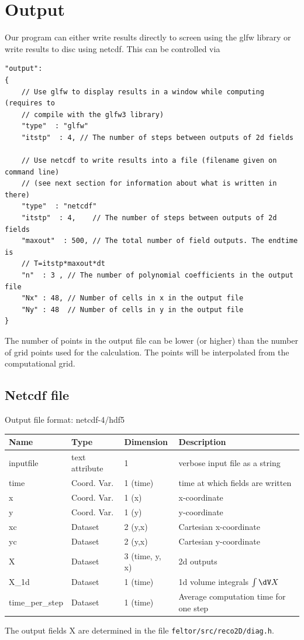 \section{Output}
Our program can either write results directly to screen using the glfw library
or write results to disc using netcdf.
This can be controlled via
\begin{verbatim}
"output":
{
    // Use glfw to display results in a window while computing (requires to
    // compile with the glfw3 library)
    "type"  : "glfw"
    "itstp"  : 4, // The number of steps between outputs of 2d fields

    // Use netcdf to write results into a file (filename given on command line)
    // (see next section for information about what is written in there)
    "type"  : "netcdf"
    "itstp"  : 4,    // The number of steps between outputs of 2d fields
    "maxout"  : 500, // The total number of field outputs. The endtime is
    // T=itstp*maxout*dt
    "n"  : 3 , // The number of polynomial coefficients in the output file
    "Nx" : 48, // Number of cells in x in the output file
    "Ny" : 48  // Number of cells in y in the output file
}
\end{verbatim}
The number of points in the output file can be lower (or higher) than the number of
grid points used for the calculation. The points will be interpolated from the
computational grid.
\subsection{Netcdf file}
Output file format: netcdf-4/hdf5

\begin{longtable}{lll>{\RaggedRight}p{7cm}}
\toprule
\rowcolor{gray!50}\textbf{Name} &  \textbf{Type} & \textbf{Dimension} & \textbf{Description}  \\ \midrule
inputfile        & text attribute & 1 & verbose input file as a string \\
time             & Coord. Var. & 1 (time) & time at which fields are written \\
x                & Coord. Var. & 1 (x) & x-coordinate  \\
y                & Coord. Var. & 1 (y) & y-coordinate \\
xc               & Dataset & 2 (y,x) & Cartesian x-coordinate  \\
yc               & Dataset & 2 (y,x) & Cartesian y-coordinate \\
X                & Dataset & 3 (time, y, x) & 2d outputs \\
X\_1d            & Dataset & 1 (time) & 1d volume integrals $\int \dV X$ \\
time\_per\_step  & Dataset & 1 (time) & Average computation time for one step \\
\bottomrule
\end{longtable}
The output fields X are determined in the file \texttt{feltor/src/reco2D/diag.h}.



